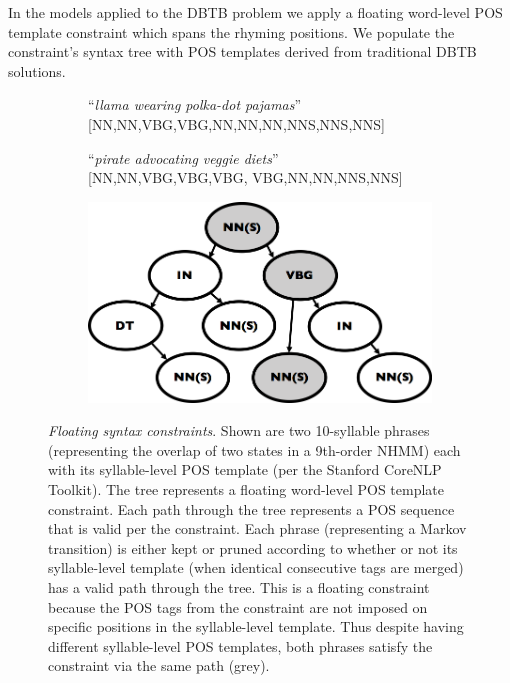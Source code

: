 \documentclass[phd,electronic,oneside,twosidetoc,letterpaper,chaptercenter,parttop,lof,lot]{byumsphd}
\begin{document}
In the models applied to the DBTB problem we apply a floating word-level POS template constraint which spans the rhyming positions. We populate the constraint's syntax tree with POS templates derived from traditional DBTB solutions.

\begin{figure}
    \centering
    \begin{subfigure}[b]{\linewidth}
       	\centering
		``\textit{llama wearing polka-dot pajamas}'' \\
		{[NN,NN,VBG,VBG,NN,NN,NN,NNS,NNS,NNS]} \\
	\end{subfigure}
    \begin{subfigure}[b]{\linewidth}
    	\vspace{.3cm}
        \centering
        ``\textit{pirate advocating veggie diets}'' \\
		{[NN,NN,VBG,VBG,VBG, VBG,NN,NN,NNS,NNS]} \\
    \end{subfigure}
    \begin{subfigure}[b]{.7\linewidth}
        \vspace{.3cm}
        \includegraphics[width=\linewidth]{syntax_tree}
    \end{subfigure}
    \caption{\textit{Floating syntax constraints}. Shown are two 10-syllable phrases (representing the overlap of two states in a 9th-order NHMM) each with its syllable-level POS template (per the Stanford CoreNLP Toolkit). The tree represents a floating word-level POS template constraint. Each path through the tree represents a POS sequence that is valid per the constraint. Each phrase (representing a Markov transition) is either kept or pruned according to whether or not its syllable-level template (when identical consecutive tags are merged) has a valid path through the tree. This is a floating constraint because the POS tags from the constraint are not imposed on specific positions in the syllable-level template. Thus despite having different syllable-level POS templates, both phrases satisfy the constraint via the same path (grey).}
    \label{fig:syntax_tree}
\end{figure}
\end{document}
